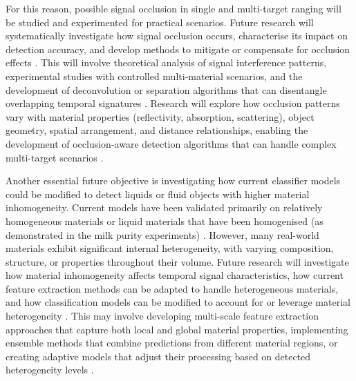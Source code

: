 \documentclass[12pt,a4paper,oneside]{report}
\begin{document}
For this reason, possible signal occlusion in single and multi-target ranging will be studied and experimented for practical scenarios. Future research will systematically investigate how signal occlusion occurs, characterise its impact on detection accuracy, and develop methods to mitigate or compensate for occlusion effects \cite{tontini2024,jungerman2022}. This will involve theoretical analysis of signal interference patterns, experimental studies with controlled multi-material scenarios, and the development of deconvolution or separation algorithms that can disentangle overlapping temporal signatures \cite{heinz2001,koerner2021}. Research will explore how occlusion patterns vary with material properties (reflectivity, absorption, scattering), object geometry, spatial arrangement, and distance relationships, enabling the development of occlusion-aware detection algorithms that can handle complex multi-target scenarios \cite{becker2023}.

Another essential future objective is investigating how current classifier models could be modified to detect liquids or fluid objects with higher material inhomogeneity. Current models have been validated primarily on relatively homogeneous materials or liquid materials that have been homogenised (as demonstrated in the milk purity experiments) \cite{nielsen2013,aernouts2015}. However, many real-world materials exhibit significant internal heterogeneity, with varying composition, structure, or properties throughout their volume. Future research will investigate how material inhomogeneity affects temporal signal characteristics, how current feature extraction methods can be adapted to handle heterogeneous materials, and how classification models can be modified to account for or leverage material heterogeneity \cite{su2016,becker2023,elachi2021}. This may involve developing multi-scale feature extraction approaches that capture both local and global material properties, implementing ensemble methods that combine predictions from different material regions, or creating adaptive models that adjust their processing based on detected heterogeneity levels \cite{tafone2023}.
\end{document}
